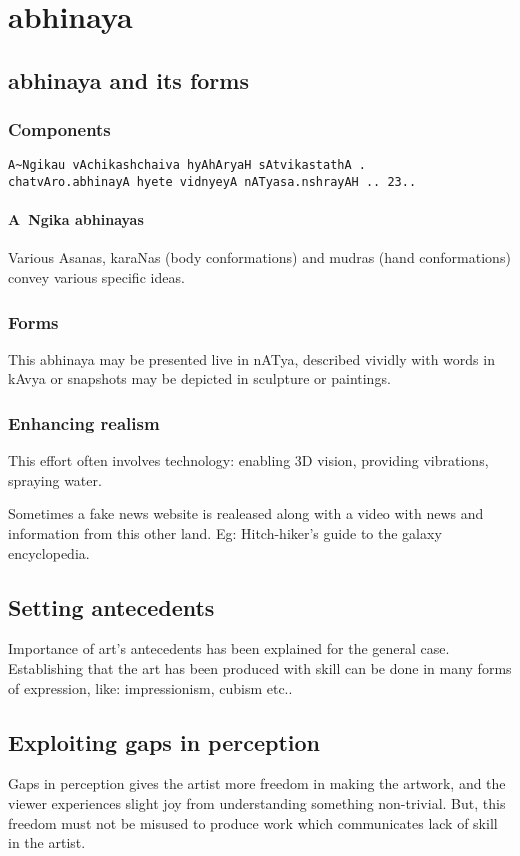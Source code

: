 \documentclass[oneside, article]{memoir}
\begin{document}
\chapter{abhinaya}
\section{abhinaya and its forms}
\subsection{Components}
\begin{verbatim}
A~Ngikau vAchikashchaiva hyAhAryaH sAtvikastathA .
chatvAro.abhinayA hyete vidnyeyA nATyasa.nshrayAH .. 23..
\end{verbatim}

\subsubsection{A~Ngika abhinayas}
Various Asanas, karaNas (body conformations) and mudras (hand conformations) convey various specific ideas.

\subsection{Forms}
This abhinaya may be presented live in nATya, described vividly with words in kAvya or snapshots may be depicted in sculpture or paintings.

\subsection{Enhancing realism}
This effort often involves technology: enabling 3D vision, providing vibrations, spraying water.

Sometimes a fake news website is realeased along with a video with news and information from this other land. Eg: Hitch-hiker's guide to the galaxy encyclopedia.

\section{Setting antecedents}
Importance of art's antecedents has been explained for the general case. Establishing that the art has been produced with skill can be done in many forms of expression, like: impressionism, cubism etc..

\section{Exploiting gaps in perception}
Gaps in perception gives the artist more freedom in making the artwork, and the viewer experiences slight joy from understanding something non-trivial. But, this freedom must not be misused to produce work which communicates lack of skill in the artist.
\end{document}
